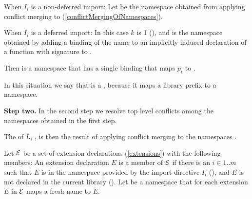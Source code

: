 \documentclass[makeidx]{article}
\begin{document}
\LMHash{}%
When $I_i$ is a non-deferred import:
Let  be the namespace obtained from applying
conflict merging to
(\ref{conflictMergingOfNamespaces}).

\LMHash{}%
When $I_i$ is a deferred import:
In this case $k$ is 1
(),
and  is the namespace obtained by
adding a binding of the name 
to an implicitly induced declaration of a function with signature
to .

\LMHash{}%
Then  is a namespace that has
a single binding that maps $p_i$ to .

\LMHash{}%
In this situation we say that  is a
,
because it maps a library prefix to a namespace.

\EndCase

\LMHash{}%
{\bf Step two.}
In the second step we resolve top level conflicts
among the namespaces obtained in the first step.

\LMHash{}%
The  of $L$, ,
is then the result of applying conflict merging to the namespaces
.

\LMHash{}%
Let $\cal E$ be a set of extension declarations
(\ref{extensions})
with the following members:
An extension declaration $E$ is a member of $\cal E$
if there is an $i \in 1 .. m$ such that
$E$ is in the namespace provided by the import directive $I_i$
(),
and $E$ is not declared in the current library
().
Let  be a namespace that
for each extension $E$ in $\cal E$ maps a fresh name to $E$.
\end{document}
